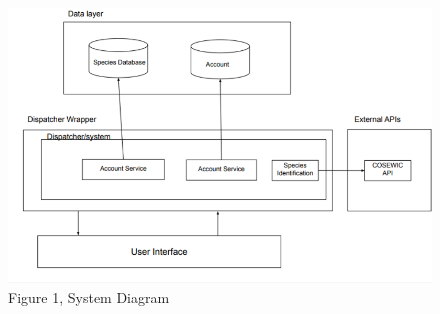 \documentclass[]{article}
\begin{document}
\begin{figure}[h]
\centering
\includegraphics[width=\textwidth]{figure1.png}
\caption{Figure 1, System Diagram}
\label{fig:system_diagram}
\end{figure}

\end{document}
